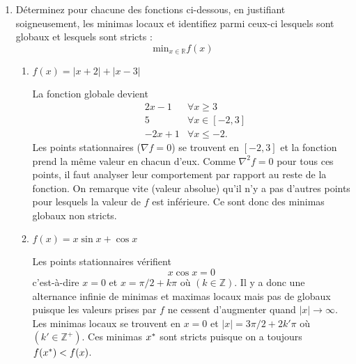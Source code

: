 \begin{enumerate}
  \item Déterminez pour chacune des fonctions ci-dessous,
  en justifiant soigneusement, les minimas locaux
  et identifiez parmi ceux-ci lesquels sont globaux 
  et lesquels sont stricts :
  \[ \text{min}_{x \in \mathbb{R}} f(x) \]
  
  \begin{enumerate}
    \item $f(x) = |x+2| + |x-3|$
      \begin{solution}
        La fonction globale devient
        \begin{align*}
          &2x-1& \forall x \geq 3 \\
          &5& \forall x \in [-2,3] \\
          &-2x+1& \forall x \leq -2.
        \end{align*}
        Les points stationnaires ($\nabla f = 0$) se trouvent en $[-2,3]$
        et la fonction prend la même valeur en chacun d'eux.
        Comme $\nabla^2 f=0$ pour tous ces points,
        il faut analyser leur comportement par rapport au reste de la fonction.
        On remarque vite (valeur absolue) 
        qu'il n'y a pas d'autres points pour lesquels
        la valeur de $f$ est inférieure.
        Ce sont donc des minimas globaux non stricts.
      \end{solution}
      
    \item $f(x) = x\sin{x} + \cos{x}$
      \begin{solution}
        Les points stationnaires vérifient
        \[x\cos{x} = 0\]
        c'est-à-dire $x=0$
        et $x= \pi/2 + k\pi$ où $(k\in\mathbb{Z})$.
        Il y a donc une alternance infinie de minimas et maximas locaux
        mais pas de globaux puisque les valeurs prises par $f$ ne cessent
        d'augmenter quand $|x| \rightarrow \infty$.
        Les minimas locaux se trouvent en $x=0$ 
        et $|x|= 3\pi/2 + 2k'\pi$ où $(k'\in\mathbb{Z}^+)$.
        Ces minimas $x^*$ sont stricts 
        puisque on a toujours $f(x^*) < f(x)$.
      \end{solution}
      

\end{enumerate}
\end{enumerate}
